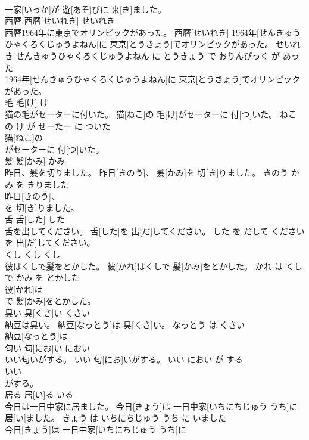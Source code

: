\documentclass[8pt]{extreport}
\begin{document}
\begin{CJK}{UTF8}{min}
\\	一家[いっか]が 遊[あそ]びに 来[き]ました。			
\\	西暦	西暦[せいれき]	せいれき	
\\	西暦1964年に東京でオリンピックがあった。	西暦[せいれき] 1964年[せんきゅうひゃくろくじゅうよねん]に 東京[とうきょう]でオリンピックがあった。	せいれき せんきゅうひゃくろくじゅうよねん に とうきょう で おりんぴっく が あった	
\\	1964年[せんきゅうひゃくろくじゅうよねん]に 東京[とうきょう]でオリンピックがあった。			
\\	毛	毛[け]	け	
\\	猫の毛がセーターに付いた。	猫[ねこ]の 毛[け]がセーターに 付[つ]いた。	ねこ の け が せーたー に ついた	
\\	猫[ねこ]の
\\	がセーターに 付[つ]いた。			
\\	髪	髪[かみ]	かみ	
\\	昨日、髪を切りました。	昨日[きのう]、 髪[かみ]を 切[き]りました。	きのう かみ を きりました	
\\	昨日[きのう]、
\\	を 切[き]りました。			
\\	舌	舌[した]	した	
\\	舌を出してください。	舌[した]を 出[だ]してください。	した を だして ください	
\\	を 出[だ]してください。			
\\	くし	くし	くし	
\\	彼はくしで髪をとかした。	彼[かれ]はくしで 髪[かみ]をとかした。	かれ は くし で かみ を とかした	
\\	彼[かれ]は
\\	で 髪[かみ]をとかした。			
\\	臭い	臭[くさ]い	くさい	
\\	納豆は臭い。	納豆[なっとう]は 臭[くさ]い。	なっとう は くさい	
\\	納豆[なっとう]は
\\	匂い	匂[にお]い	におい	
\\	いい匂いがする。	いい 匂[にお]いがする。	いい におい が する	
\\	いい
\\	がする。			
\\	居る	居[い]る	いる	
\\	今日は一日中家に居ました。	今日[きょう]は 一日中家[いちにちじゅう うち]に 居[い]ました。	きょう は いちにちじゅう うち に いました	
\\	今日[きょう]は 一日中家[いちにちじゅう うち]に

\end{CJK}
\end{document}
